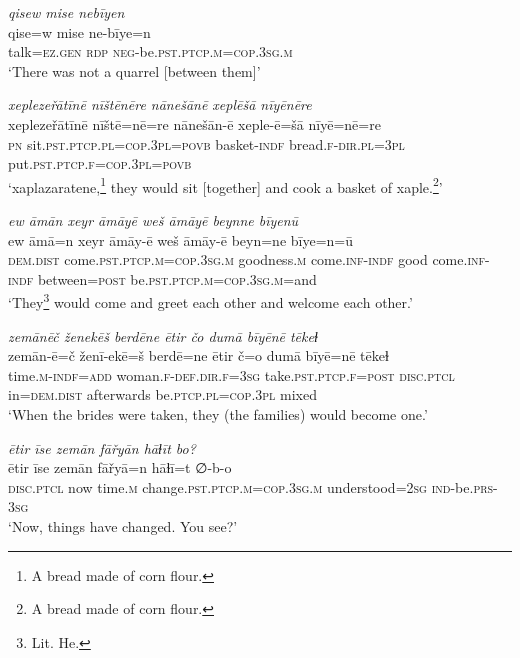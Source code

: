 \ea \label{RE.23}
\textit{qisew mise nebīyen} \\ 
\gll qise=w mise ne-bīye=n \\ 
 talk\textsc{=ez.gen} \textsc{rdp} \textsc{neg-}be\textsc{.pst}\textsc{.ptcp}\textsc{.m}\textsc{=cop}\textsc{.3sg}\textsc{.m} \\ 
\glt `There was not a quarrel [between them]'
\z 
 
\ea \label{RE.24}
\textit{xeplezeřātīnē nīštēnēre nānešānē xeplēšā nīyēnēre} \\ 
\gll xeplezeřātīnē nīštē=nē=re nānešān-ē xeple-ē=šā nīyē=nē=re \\ 
 \textsc{pn} sit\textsc{.pst}\textsc{.ptcp}\textsc{.pl}\textsc{=cop}\textsc{.3pl}\textsc{=\textsc{povb}} basket\textsc{-indf} bread\textsc{.f}\textsc{-dir}\textsc{.pl}\textsc{=3pl} put\textsc{.pst}\textsc{.ptcp}\textsc{.f}\textsc{=cop}\textsc{.3pl}\textsc{=\textsc{povb}} \\ 
\glt `xaplazaratene,\footnote{A bread made of corn flour.} they would sit [together] and cook a basket of xaple.\footnote{A bread made of corn flour.}'
\z 
 
\ea \label{RE.25}
\textit{ew āmān xeyr āmāyē weš āmāyē beynne bīyenū} \\ 
\gll ew āmā=n xeyr āmāy-ē weš āmāy-ē beyn=ne bīye=n=ū \\ 
 \textsc{dem.dist} come\textsc{.pst}\textsc{.ptcp}\textsc{.m}\textsc{=cop}\textsc{.3sg}\textsc{.m} goodness\textsc{.m} come\textsc{.inf}\textsc{-indf} good come\textsc{.inf}\textsc{-indf} between\textsc{=\textsc{post}} be\textsc{.pst}\textsc{.ptcp}\textsc{.m}\textsc{=cop}\textsc{.3sg}\textsc{.m}=and \\ 
\glt `They\footnote{Lit. He.} would come and greet each other and welcome each other.'
\z 
 
\ea \label{RE.26}
\textit{zemānēč ženekēš berdēne ētir čo dumā bīyēnē tēkeɫ} \\ 
\gll zemān-ē=č ženī-ekē=š berdē=ne ētir č=o dumā bīyē=nē tēkeɫ \\ 
 time\textsc{.m}\textsc{-indf}\textsc{=add} woman\textsc{.f}\textsc{-def}\textsc{.dir}\textsc{.f}\textsc{=3sg} take\textsc{.pst}\textsc{.ptcp}\textsc{.f}\textsc{=\textsc{post}} \textsc{disc.ptcl} in=\textsc{dem.dist} afterwards be\textsc{.ptcp}\textsc{.pl}\textsc{=cop}\textsc{.3pl} mixed \\ 
\glt `When the brides were taken, they (the families) would become one.'
\z 
 
\ea \label{RE.27}
\textit{ētir īse zemān fāřyān hāɫīt bo?} \\ 
\gll ētir īse zemān fāřyā=n hāɫī=t ∅-b-o \\ 
 \textsc{disc.ptcl} now time\textsc{.m} change\textsc{.pst}\textsc{.ptcp}\textsc{.m}\textsc{=cop}\textsc{.3sg}\textsc{.m} understood\textsc{=\textsc{2sg}} \textsc{ind-}be\textsc{.prs}\textsc{-3sg} \\ 
\glt `Now, things have changed. You see?'
\z 
 
